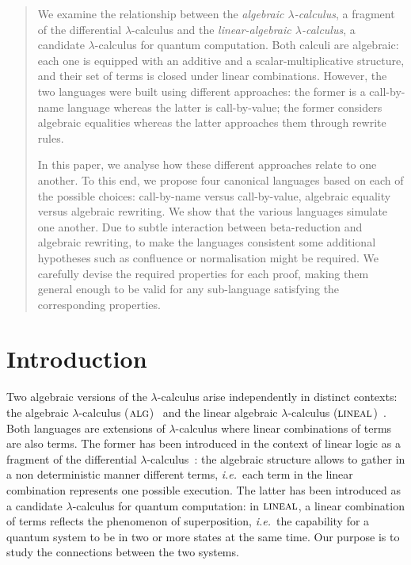 \documentclass{LMCS}
\newcommand{\olin}{\mbox{\sc lineal}}
\newcommand{\oalg}{\mbox{\sc alg}}
\begin{document}
\begin{abstract} 
  We examine the relationship between the {\em algebraic
  $\lambda$-calculus}, a fragment of the differential
  $\lambda$-calculus and the \emph{linear-algebraic
  $\lambda$-calculus}, a candidate $\lambda$-calculus for quantum
  computation. Both calculi are algebraic: each one is equipped with
  an additive and a scalar-multiplicative structure, and their set of
  terms is closed under linear combinations. However, the two
  languages were built using different approaches: the former is a
  call-by-name language whereas the latter is call-by-value; the
  former considers algebraic equalities whereas the latter approaches
  them through rewrite rules.

  In this paper, we analyse how these different approaches relate to one
  another. To this end, we propose four canonical languages based
  on each of the possible choices: call-by-name versus call-by-value,
  algebraic equality versus algebraic rewriting. We show that the
  various languages simulate one another.
Due to subtle interaction between beta-reduction and algebraic
  rewriting, to make the languages consistent some additional
  hypotheses such as confluence or normalisation might be required. We carefully devise
  the required properties for each proof, making them general enough
  to be valid for any sub-language satisfying the corresponding
  properties. 
\end{abstract}

\maketitle

\section{Introduction}

Two algebraic versions of the $\lambda$-calculus arise independently in distinct contexts: the algebraic $\lambda$-calculus ($\oalg$)~\cite{VauxMSCS09} and the linear algebraic $\lambda$-calculus ($\olin$)~\cite{ArrighiDowekRTA08}. 
Both languages are extensions of $\lambda$-calculus where linear combinations of terms are also terms.
The former has been introduced in the context of linear logic as a fragment of the differential $\lambda$-calculus~\cite{EhrhardRegnierTCS03}: the algebraic structure allows to gather in a non deterministic manner different terms, {\em i.e.}\ each term in the linear combination represents one possible execution. The latter has been introduced as a candidate $\lambda$-calculus for quantum computation: in $\olin$, a linear combination of terms reflects the phenomenon of superposition, {\em i.e.}\ the capability for a quantum system to be in two or more states at the same time.
Our purpose is to study the connections between the two systems.
\end{document}
